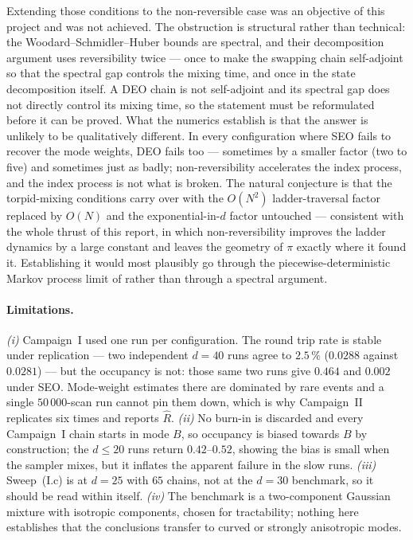 Extending those conditions to the non-reversible case was an objective of this
project and was not achieved. The obstruction is structural rather than
technical: the Woodard--Schmidler--Huber bounds are spectral, and their
decomposition argument uses reversibility twice --- once to make the swapping
chain self-adjoint so that the spectral gap controls the mixing time, and once in
the state decomposition itself. A DEO chain is not self-adjoint and its spectral
gap does not directly control its mixing time, so the statement must be
reformulated before it can be proved. What the numerics establish is that the
answer is unlikely to be qualitatively different. In every configuration where
SEO fails to recover the mode weights, DEO fails too --- sometimes by a smaller
factor (two to five) and sometimes just as badly; non-reversibility accelerates the index
process, and the index process is not what is broken. The natural conjecture is
that the torpid-mixing conditions carry over with the $O(N^2)$ ladder-traversal
factor replaced by $O(N)$ and the exponential-in-$d$ factor untouched ---
consistent with the whole thrust of this report, in which non-reversibility
improves the ladder dynamics by a large constant and leaves the geometry of $\pi$
exactly where it found it. Establishing it would most plausibly go through the
piecewise-deterministic Markov process limit of \citet{syed2022} rather than
through a spectral argument.

\paragraph{Limitations.}
\emph{(i)} Campaign~I used one run per configuration. The round trip rate is
stable under replication --- two independent $d=40$ runs agree to $2.5\,\%$
($0.0288$ against $0.0281$) --- but the occupancy is not: those same two runs give
$0.464$ and $0.002$ under SEO. Mode-weight estimates there are dominated by rare
events and a single $50\,000$-scan run cannot pin them down, which is why
Campaign~II replicates six times and reports $\hat R$. \emph{(ii)} No burn-in is
discarded and every Campaign~I chain starts in mode $B$, so occupancy is biased
towards $B$ by construction; the $d\le20$ runs return $0.42$--$0.52$, showing the
bias is small when the sampler mixes, but it inflates the apparent failure in the
slow runs. \emph{(iii)} Sweep~(I.c) is at $d=25$ with $65$ chains, not at the
$d=30$ benchmark, so it should be read within itself. \emph{(iv)} The benchmark is
a two-component Gaussian mixture with isotropic components, chosen for
tractability; nothing here establishes that the conclusions transfer to curved or
strongly anisotropic modes.


